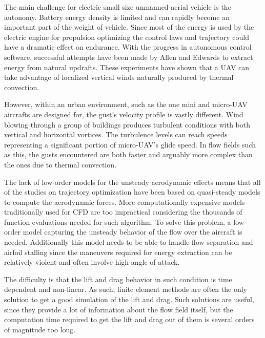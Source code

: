  \label{subsec:dynsoar}

The main challenge for electric small size unmanned aerial vehicle is the autonomy.
Battery energy density is limited and can rapidly become an important part of the weight of vehicle.
Since most of the energy is used by the electric engine for propulsion optimizing the control laws and trajectory could have a dramatic effect on endurance. 
With the progress in autonomous control software, successful attempts have been made by Allen \cite{flight_test_soaring_NASA} and Edwards \cite{flight_test_soaring_NCU} to extract energy from natural updrafts.
These experiments have shown that a UAV can take advantage of localized vertical winds naturally produced by thermal convection.

\par However, within an urban environment, such as the one mini and micro-UAV aircrafts are designed for, the gust's velocity profile is vastly different. 
Wind blowing through a group of buildings produces turbulent conditions with both vertical and horizontal vortices.
The turbulence levels can reach speeds representing a significant portion of micro-UAV's glide speed. 
In flow fields such as this, the gusts encountered are both faster and arguably more complex than the ones due to thermal convection.

\par The lack of low-order models for the unsteady aerodynamic effects means that all of the studies on trajectory optimization have been based on quasi-steady models to compute the aerodynamic forces.
More computationally expensive models traditionally used for CFD are too impractical considering the thousands of function evaluations needed for such algorithm.
To solve this problem, a low-order model capturing the unsteady behavior of the flow over the aircraft is needed.
Additionally this model needs to be able to handle flow separation and airfoil stalling since the maneuvers required for energy extraction can be relatively violent and often involve high angle of attack.


The difficulty is that the lift and drag behavior in such condition is time dependent and non-linear.
As such, finite element methods are often the only solution to get a good simulation of the lift and drag.
Such solutions are useful, since they provide a lot of information about the flow field itself, but the computation time required to get the lift and drag out of them is several orders of magnitude too long.

